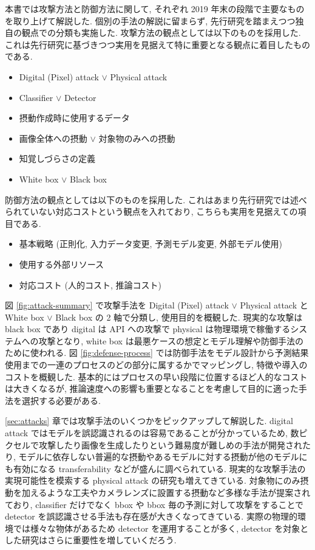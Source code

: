 本書では攻撃方法と防御方法に関して, それぞれ 2019 年末の段階で主要なものを取り上げて解説した.
個別の手法の解説に留まらず, 先行研究を踏まえつつ独自の観点での分類も実施した.
攻撃方法の観点としては以下のものを採用した.
これは先行研究に基づきつつ実用を見据えて特に重要となる観点に着目したものである.
%
\begin{itemize}
  \item Digital (Pixel) attack $\lor$ Physical attack
  \item Classifier $\lor$ Detector
  \item 摂動作成時に使用するデータ
  \item 画像全体への摂動 $\lor$ 対象物のみへの摂動
  \item 知覚しづらさの定義
  \item White box $\lor$ Black box
\end{itemize}
%
防御方法の観点としては以下のものを採用した.
これはあまり先行研究では述べられていない対応コストという観点を入れており, こちらも実用を見据えての項目である.
%
\begin{itemize}
  \item 基本戦略 (正則化, 入力データ変更, 予測モデル変更, 外部モデル使用)
  \item 使用する外部リソース
  \item 対応コスト (人的コスト, 推論コスト)
\end{itemize}
%
図 \ref{fig:attack-summary} で攻撃手法を Digital (Pixel) attack $\lor$ Physical attack と White box $\lor$ Black box の 2 軸で分類し, 使用目的を概観した.
現実的な攻撃は black box であり digital は API への攻撃で physical は物理環境で稼働するシステムへの攻撃となり, white box は最悪ケースの想定とモデル理解や防御手法のために使われる.
図 \ref{fig:defense-process} では防御手法をモデル設計から予測結果使用までの一連のプロセスのどの部分に属するかでマッピングし, 特徴や導入のコストを概観した.
基本的にはプロセスの早い段階に位置するほど人的なコストは大きくなるが, 推論速度への影響も重要となることを考慮して目的に適った手法を選択する必要がある.

\ref{sec:attacks} 章では攻撃手法のいくつかをピックアップして解説した.
digital attack ではモデルを誤認識されるのは容易であることが分かっているため, 数ピクセルで攻撃したり画像を生成したりという難易度が難しめの手法が開発されたり, モデルに依存しない普遍的な摂動やあるモデルに対する摂動が他のモデルにも有効になる transferability などが盛んに調べられている.
現実的な攻撃手法の実現可能性を模索する physical attack の研究も増えてきている.
対象物にのみ摂動を加えるような工夫やカメラレンズに設置する摂動など多様な手法が提案されており, classifier だけでなく bbox や bbox 毎の予測に対して攻撃をすることで detector を誤認識させる手法も存在感が大きくなってきている.
実際の物理的環境では様々な物体があるため detector を運用することが多く, detector を対象とした研究はさらに重要性を増していくだろう.

